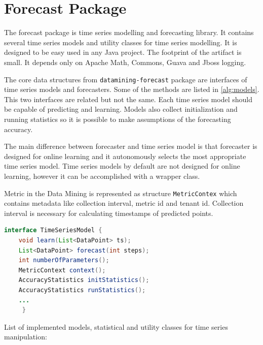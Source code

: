     \section{Forecast Package}
    The forecast package is time series modelling and forecasting library. It contains several time series models
    and utility classes for time series modelling. It is designed to be easy used in any Java project. The footprint
    of the artifact is small. It depends only on Apache Math, Commons, Guava and Jboss logging.

    The core data structures from \texttt{datamining-forecast} package are interfaces of time series models
    and forecasters. Some of the methods are listed in \ref{alg:models}. This two interfaces are related but not the
    same. Each time series model should be capable of predicting and learning. Models also collect initialization and
    running statistics so it is possible to make assumptions of the forecasting accuracy.

    The main difference between forecaster and time series model is that forecaster is designed for online learning
    and it autonomously selects the most appropriate time series model. Time series models by default are not
    designed for online learning, however it can be accomplished with a wrapper class.

    Metric in the Data Mining is represented as structure \texttt{MetricContex} which contains metadata like
    collection interval, metric id and tenant id. Collection interval is necessary for calculating timestamps of
    predicted points.

    \begin{lstlisting}[caption={Interface for time series models.}, language=Java, label={alg:models}]
interface TimeSeriesModel {
    void learn(List<DataPoint> ts);
    List<DataPoint> forecast(int steps);
    int numberOfParameters();
    MetricContext context();
    AccuracyStatistics initStatistics();
    AccuracyStatistics runStatistics();
    ...
     }
    \end{lstlisting}

    List of implemented models, statistical and utility classes for time series manipulation:

